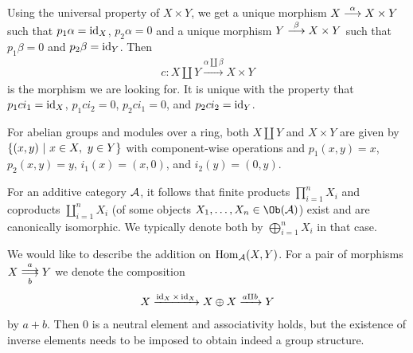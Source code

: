 \documentclass[a4paper,parskip=half,numbers=enddot, DIV=12]{scrreprt}
\begin{document}
\begin{rem*}
\begin{alphanumerate}
	 	Using the universal property of $X\times Y$, we get a unique morphism $X\morphism[\alpha]X\times Y$ such that $p_1\alpha=\operatorname{id}_X$, $p_2\alpha=0$ and a unique morphism $Y\morphism[\beta]X\times Y$ such that $p_1\beta=0$ and $p_2\beta=\operatorname{id}_Y$. Then 
	 	\begin{align*}
	 		c\colon X\amalg Y\xrightarrow{\alpha\amalg\beta}X\times Y
	 	\end{align*}
	 	is the morphism we are looking for. It is unique with the property that $p_1 c i_1=\operatorname{id}_X$, $p_1 c i_2=0$, $p_2 c i_1=0$, and $p_2 c i_2=\operatorname{id}_Y$.
	 	\item For abelian groups and modules over a ring, both $X\amalg Y$ and $X\times Y$ are given by $\left\{(x,y)\ \middle|\  x\in X,\ y\in Y\right\}$ with component-wise operations and $p_1(x,y)=x$, $p_2(x,y)=y$, $i_1(x)=(x,0)$, and $i_2(y)=(0,y)$.
	 	\item For an additive category $\mathcal{A}$, it follows that finite products $\prod_{i=1}^nX_i$ and coproducts $\coprod_{i=1}^nX_i$ (of some objects $X_1,\ldots,X_n\in\Ob(\Aa)$) exist and are canonically isomorphic. We typically denote both by $\bigoplus_{i=1}^nX_i$ in that case.
	 	\item We would like to describe the addition on $\operatorname{Hom}_{\mathcal{A}}(X,Y)$. For a pair of morphisms $X\doublemorphism[a][b]Y$ we denote the composition
	 	\begin{align*}
	 		X\xrightarrow{\operatorname{id}_X\times\operatorname{id}_X}X\oplus X\xrightarrow{a\amalg b}Y
	 	\end{align*}
	 	by $a+b$. Then $0$ is a neutral element and associativity holds, but the existence of inverse elements needs to be imposed to obtain indeed a group structure.
	 	

\end{alphanumerate}
\end{rem*}
\end{document}
